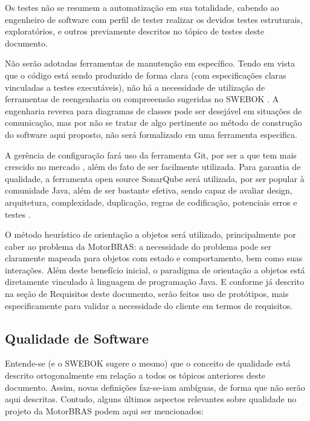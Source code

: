 \documentclass[12pt,journal,compsoc]{IEEEtran}
\begin{document}
Os testes não se resumem a automatização em sua totalidade, cabendo ao engenheiro de software com perfil de tester realizar os devidos testes estruturais, exploratórios, e outros previamente descritos no tópico de testes deste documento.

Não serão adotadas ferramentas de manutenção em específico. Tendo em vista que o código está sendo produzido de forma clara (com especificações claras vinculadas a testes executáveis), não há a necessidade de utilização de ferramentas de reengenharia ou compreeensão sugeridas no SWEBOK \cite{society_software_2004}. A engenharia reversa para diagramas de classes pode ser desejável em situações de comunicação, mas por não se tratar de algo pertinente ao método de construção do software aqui proposto, não será formalizado em uma ferramenta especifica.

A gerência de configuração fará uso da ferramenta Git, por ser a que tem mais crescido no mercado \cite{scm_ranking}, além do fato de ser facilmente utilizada. Para garantia de qualidade, a ferramenta open source SonarQube será utilizada, por ser popular à comunidade Java, além de ser bastante efetiva, sendo capaz de avaliar design, arquitetura, complexidade, duplicação, regras de codificação, potenciais erros e testes \cite{quality_java_2010}.   

O método heurístico de orientação a objetos será utilizado, principalmente por caber ao problema da MotorBRAS: a necessidade do problema pode ser claramente mapeada para objetos com estado e comportamento, bem como suas interações. Além deste benefício inicial, o paradigma de orientação a objetos está diretamente vinculado à linguagem de programação Java. E conforme já descrito na seção de Requisitos deste documento, serão feitos uso de protótipos, mais especificamente para validar a necessidade do cliente em termos de requisitos.  


\subsection{Qualidade de Software}

Entende-se (e o SWEBOK \cite{society_software_2004} sugere o mesmo) que o conceito de qualidade está descrito ortogonalmente em relação a todos os tópicos anteriores deste documento. Assim, novas de‌finições faz-se-iam ambíguas, de forma que não serão aqui descritas. Contudo, alguns últimos aspectos relevantes sobre qualidade no projeto da MotorBRAS podem aqui ser mencionados:
\end{document}
